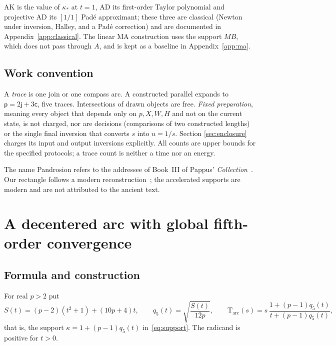 \documentclass[10pt,a4paper]{article}
\theoremstyle{plain}
\theoremstyle{remark}
\numberwithin{equation}{section}
\newcommand{\jn}{\mathsf{j}}          %
\newcommand{\pl}{\mathsf{p}}          %
\newcommand{\ar}{\mathsf{c}}          %
\newcommand{\Tm}{\mathrm{T}}
\begin{document}
AK is the value of $\kappa_*$ at $t=1$, AD its first-order Taylor polynomial and projective AD its
$[1/1]$ Pad\'e approximant; these three are classical (Newton under inversion, Halley, and a Pad\'e
correction) and are documented in Appendix~\ref{app:classical}. The linear MA construction uses the
support $MB$, which does not pass through $A$, and is kept as a baseline in Appendix~\ref{app:ma}.

\subsection{Work convention}\label{sec:convention}

A \emph{trace} is one join or one compass arc. A constructed parallel expands to $\pl=2\jn+3\ar$, five
traces. Intersections of drawn objects are free. \emph{Fixed preparation}, meaning every object that
depends only on $p,X,W,H$ and not on the current state, is not charged, nor are decisions (comparisons
of two constructed lengths) or the single final inversion that converts $s$ into $u=1/s$. Section
\ref{sec:enclosure} charges its input and output inversions explicitly. All counts are upper bounds for
the specified protocols; a trace count is neither a time nor an energy.

The name Pandrosion refers to the addressee of Book~III of Pappus' \emph{Collection}~\cite{pappus}. Our
rectangle follows a modern reconstruction~\cite{launay}; the accelerated supports are modern and are not
attributed to the ancient text.

\section{A decentered arc with global fifth-order convergence}\label{sec:arc}

\subsection{Formula and construction}

For real $p>2$ put
\begin{equation}\label{eq:arc}
S(t)=(p-2)(t^{2}+1)+(10p+4)t,\qquad q_5(t)=\sqrt{\frac{S(t)}{12p}},\qquad
\Tm_{\mathrm{arc}}(s)=s\,\frac{1+(p-1)q_5(t)}{t+(p-1)q_5(t)},
\end{equation}
that is, the support $\kappa=1+(p-1)q_5(t)$ in~\eqref{eq:support}. The radicand is positive for $t>0$.
\end{document}
